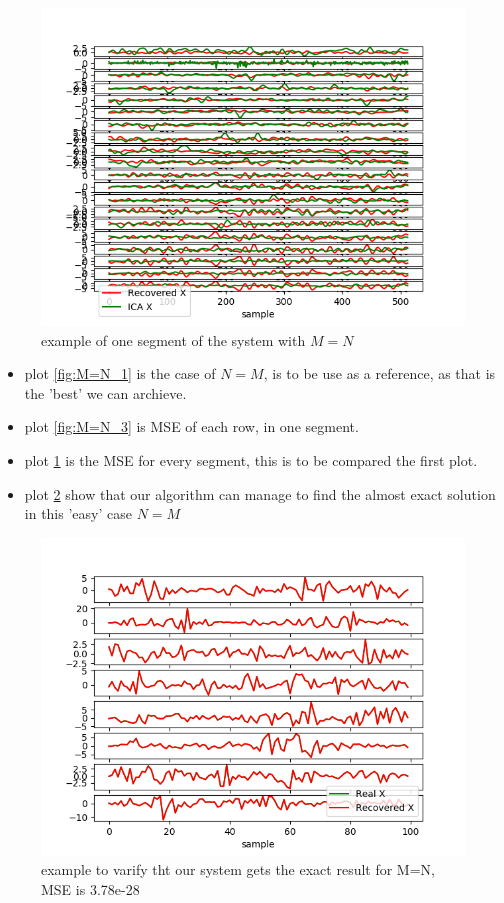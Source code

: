 \begin{figure}[H]
    \centering
	\includegraphics[scale=0.5]{figures/ch_7/M=N_2.png}
	\caption{example of one segment of the system with $M=N$}
	\label{fig:M=N_2}
\end{figure} 

\begin{itemize}
\item plot \ref{fig:M=N_1} is the case of $N=M$, is to be use as a reference, as that is the 'best' we can archieve.
\item plot \ref{fig:M=N_3} is MSE of each row, in one segment. 
\item plot \ref{fig:M=N_2} is the MSE for every segment, this is to be compared the first plot.
 
\item plot \ref{fig:M=N_test} show that our algorithm can manage to find the almost exact solution in this 'easy' case $N=M$ 
\end{itemize}

\begin{figure}[H]
    \centering
	\includegraphics[scale=0.5]{figures/ch_7/M=N_test.png}
	\caption{example to varify tht our system gets the exact result for M=N, MSE is 3.78e-28 }
	\label{fig:M=N_test}
\end{figure}





